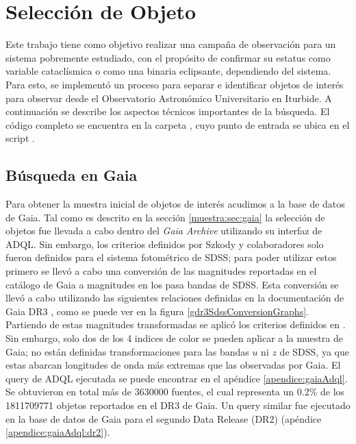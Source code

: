 \chapter{Selección de Objeto} \label{muestra:crit_seleccion}

Este trabajo tiene como objetivo realizar una campaña de observación para un
sistema pobremente estudiado, con el propósito de confirmar su estatus como
variable cataclísmica o como una binaria eclipsante, dependiendo del sistema.
Para esto, se implementó un proceso para separar e identificar objetos de
interés para observar desde el Observatorio Astronómico Universitario en
Iturbide. A continuación se describe los aspectos técnicos importantes de la
búsqueda. El código completo se encuentra en la carpeta
\href{https://github.com/KnightIV/UANL_MAPTA_Observaciones/tree/main/obsrv_plan}{},
cuyo punto de entrada se ubica en el script
\href{URLhttps://github.com/KnightIV/UANL_MAPTA_Observaciones/blob/main/obsrv_plan/main.py}{}.

\section{Búsqueda en Gaia}  \label{muestra:crit_seleccion:busqueda_fotometrica}

Para obtener la muestra inicial de objetos de interés acudimos a la base de
datos de Gaia. Tal como es descrito en la sección \ref{muestra:sec:gaia} la
selección de objetos fue llevada a cabo dentro del \textit{Gaia Archive}
utilizando su interfaz de ADQL. Sin embargo, los criterios definidos por Szkody
y colaboradores solo fueron definidos para el sistema fotométrico de SDSS; para
poder utilizar estos primero se llevó a cabo una conversión de las magnitudes
reportadas en el catálogo de Gaia a magnitudes en los pasa bandas de SDSS. Esta
conversión se llevó a cabo utilizando las siguientes relaciones definidas en la
documentación de Gaia DR3 \autocite{gdr3ReleaseDocumentation}, como se puede
ver en la figura \ref{gdr3SdssConversionGraphs}. Partiendo de estas magnitudes
transformadas se aplicó los criterios definidos en
\autocite{szkody2002CvSearchSdss}. Sin embargo, solo dos de los 4 indices de color
se pueden aplicar a la muestra de Gaia; no están definidas transformaciones para
las bandas $u$ ni $z$ de SDSS, ya que estas abarcan longitudes de onda más
extremas que las observadas por Gaia. El query de ADQL ejecutada se puede
encontrar en el apéndice \ref{apendice:gaiaAdql}. Se obtuvieron en total más de
\num{3630000} fuentes, el cual representa un 0.2\% de los \num{1811709771} objetos
reportados en el DR3 de Gaia. Un query similar fue ejecutado en la base de datos
de Gaia para el segundo Data Release (DR2) (apéndice \ref{apendice:gaiaAdql:dr2}). 

